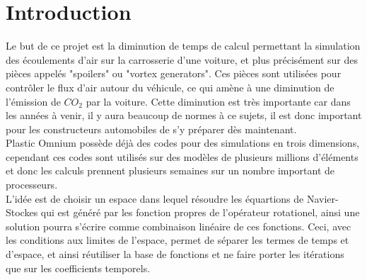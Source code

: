 \section{Introduction}

Le but de ce projet est la diminution de temps de calcul permettant la simulation des \'ecoulements d'air sur la carrosserie d'une voiture, et plus pr\'ecis\'ement sur des pi\`eces appel\'es "spoilers" ou "vortex generators". Ces pi\`eces sont utilis\'ees pour contr\^oler le flux d'air autour du v\'ehicule, ce qui am\`ene \`a une diminution de l'\'emission de $CO_2$ par la voiture. Cette diminution est tr\`es importante car dans les ann\'ees \`a venir, il y aura beaucoup de normes \`a ce sujets, il est donc important pour les constructeurs automobiles de s'y pr\'eparer d\`es maintenant.\\
Plastic Omnium poss\`ede d\'ej\`a des codes pour des simulations en trois dimensions, cependant ces codes sont utilis\'es sur des mod\`eles de plusieurs millions d'\'el\'ements et donc les calculs prennent plusieurs semaines sur un nombre important de processeurs.\\
L'id\'ee est de choisir un espace dans lequel résoudre les \'equartions de Navier-Stockes qui est g\'en\'er\'e par  les fonction propres de l'op\'erateur rotationel, ainsi une solution pourra s'\'ecrire comme combinaison lin\'eaire de ces fonctions. Ceci, avec les conditions aux limites de l'espace, permet de séparer les termes de temps et d'espace, et ainsi  réutiliser la base de fonctions et ne faire porter les itérations que sur les coefficients temporels.

